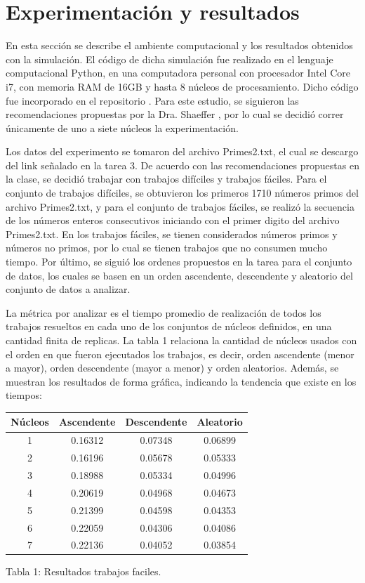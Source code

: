\documentclass{article}
\begin{document}
\section{Experimentación y resultados}

En esta sección se describe el ambiente computacional y los resultados obtenidos con la simulación. El código de dicha simulación fue realizado en el lenguaje computacional Python, en una computadora personal con procesador Intel Core i7, con memoria RAM de 16GB y hasta 8 núcleos de procesamiento. Dicho código fue incorporado en el repositorio \cite{p_3}. Para este estudio, se siguieron las recomendaciones propuestas por la Dra. Shaeffer \cite{pa}, por lo cual se decidió correr únicamente de uno a siete núcleos la experimentación. 

Los datos del experimento se tomaron del archivo Primes2.txt, el cual se descargo del link señalado en la tarea 3. De acuerdo con las recomendaciones propuestas en la clase, se decidió trabajar con trabajos difíciles y trabajos fáciles. Para el conjunto de trabajos difíciles, se obtuvieron los primeros 1710 números primos del archivo Primes2.txt, y para el conjunto de trabajos fáciles, se realizó la secuencia de los números enteros consecutivos iniciando con el primer digito del archivo Primes2.txt. En los trabajos fáciles, se tienen considerados números primos y números no primos, por lo cual se tienen trabajos que no consumen mucho tiempo. Por último, se siguió los ordenes propuestos en la tarea para el conjunto de datos, los cuales se basen en un orden ascendente, descendente y aleatorio del conjunto de datos a analizar.

La métrica por analizar es el tiempo promedio de realización de todos los trabajos resueltos en cada uno de los conjuntos de núcleos definidos, en una cantidad finita de replicas. La tabla 1 relaciona la cantidad de núcleos usados con el orden en que fueron ejecutados los trabajos, es decir, orden ascendente (menor a mayor), orden descendente (mayor a menor) y orden aleatorios. Además, se muestran los resultados de forma gráfica, indicando la tendencia que existe en los tiempos: 

\begin{center}
	\begin{tabular}{|c|c|c|c|}
		\hline
		Núcleos & Ascendente & Descendente & Aleatorio \\
		\hline
		1 & 0.16312 & 0.07348 & 0.06899 \\
		\hline
		2 & 0.16196 & 0.05678 & 0.05333 \\
		\hline
		3 & 0.18988 & 0.05334 & 0.04996 \\
		\hline
		4 & 0.20619 & 0.04968& 0.04673 \\
		\hline
		5 & 0.21399 & 0.04598 & 0.04353 \\
		\hline
		6 & 0.22059 & 0.04306 & 0.04086 \\
		\hline
		7 & 0.22136 & 0.04052 & 0.03854 \\
		\hline
	\end{tabular}
\end{center}
\begin{center}
	Tabla 1: Resultados trabajos faciles.
\end{center}
\end{document}

